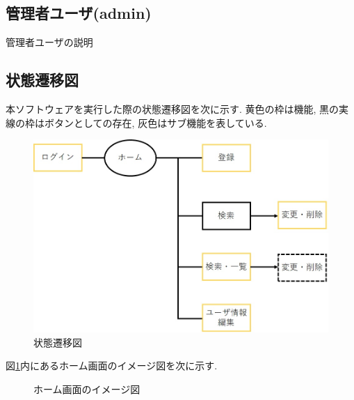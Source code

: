 \documentclass[11ptm]{jsarticle}
\begin{document}
\clearpage
\subsection{管理者ユーザ(admin)}
\label{subsec:管理者ユーザ(admin)}
管理者ユーザの説明

\clearpage
\subsection{状態遷移図}
\label{subsec:状態遷移図}
本ソフトウェアを実行した際の状態遷移図を次に示す. 黄色の枠は機能, 黒の実線の枠はボタンとしての存在, 灰色はサブ機能を表している. 
\begin{figure}[h]
  \centering
  \includegraphics[keepaspectratio, height=0.4\linewidth]{transition-diagram.jpg}
  \caption{\label{fig:状態遷移図}状態遷移図}
\end{figure}\par
図\ref{fig:状態遷移図}内にあるホーム画面のイメージ図を次に示す.
\begin{figure}[h]
  \centering
  \caption{\label{fig:ホーム画面のイメージ図}ホーム画面のイメージ図}
\end{figure}




\end{document}
